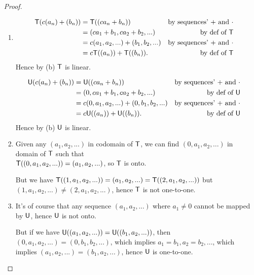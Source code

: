 \begin{proof} \ 
\begin{enumerate}
\item
\begin{align*}
    \textsf{T}(c(a_n) + (b_n)) & = \textsf{T}((c a_n + b_n)) & \text{by sequences' \(+\) and \(\cdot\)} \\
                       & = (c a_1 + b_1, c a_2 + b_2, ...) & \text{by def of \(\textsf{T}\)} \\
                       & = c(a_1, a_2, ...) + (b_1, b_2, ...) & \text{by sequences' \(+\) and \(\cdot\)} \\
                       & = c\textsf{T}((a_n)) + \textsf{T}((b_n)). & \text{by def of \(\textsf{T}\)}
\end{align*}
Hence by (b) \(\textsf{T}\) is linear.

\begin{align*}
    \textsf{U}(c(a_n) + (b_n)) & = \textsf{U}((c a_n + b_n)) & \text{by sequences' \(+\) and \(\cdot\)} \\
                       & = (0, c a_1 + b_1, c a_2 + b_2, ...) & \text{by def of \(\textsf{U}\)} \\
                       & = c(0, a_1, a_2, ...) + (0, b_1, b_2, ...) & \text{by sequences' \(+\) and \(\cdot\)} \\
                       & = c\textsf{U}((a_n)) + \textsf{U}((b_n)). & \text{by def of \(\textsf{U}\)}
\end{align*}
Hence by (b) \(\textsf{U}\) is linear.

\item
Given any \((a_1, a_2, ...)\) in codomain of \(\textsf{T}\), we can find \((0, a_1, a_2, ...)\) in domain of \(\textsf{T}\) such that \\ 
\(\textsf{T}((0, a_1, a_2, ...)) = (a_1, a_2, ...)\), so \(\textsf{T}\) is onto.

But we have \(\textsf{T}((1, a_1, a_2, ...)) = (a_1, a_2, ...) = \textsf{T}((2, a_1, a_2, ...))\) but \\
\((1, a_1, a_2, ...) \ne (2, a_1, a_2, ...)\), hence \(\textsf{T}\) is not one-to-one.

\item
It's of course that any sequence \((a_1, a_2, ...)\) where \(a_1 \ne 0\) cannot be mapped by \(\textsf{U}\), hence \(\textsf{U}\) is not onto.

But if we have \(\textsf{U}((a_1, a_2, ...)) = \textsf{U}((b_1, a_2, ...))\), then \((0, a_1, a_2, ...) = (0, b_1, b_2, ...)\), which implies \(a_1 = b_1, a_2 = b_2, ...\), which implies \((a_1, a_2, ...) = (b_1, a_2, ...)\), hence \(\textsf{U}\) is one-to-one.
\end{enumerate}
\end{proof}

